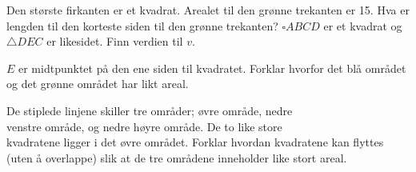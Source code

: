 \newpage
{} \vs
{}

Den største firkanten er et kvadrat. Arealet til den grønne trekanten er 15. Hva er lengden til den korteste siden til den grønne trekanten?
$ \square ABCD $ er et kvadrat og $ \triangle DEC $ er likesidet. Finn verdien til $ v $.

\newpage
{}
$ E $ er midtpunktet på den ene siden til kvadratet. Forklar hvorfor det blå området og det grønne området har likt areal.


De stiplede linjene skiller tre områder; øvre område, nedre\\ venstre område, og nedre høyre område. De to like store\\ kvadratene ligger i det øvre området. Forklar hvordan kvadratene kan flyttes (uten å overlappe) slik at de tre områdene inneholder like stort areal.



